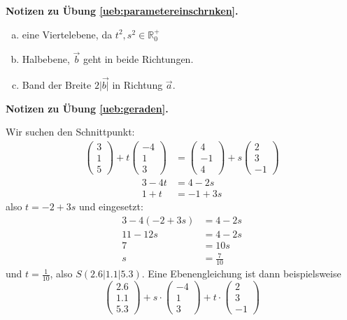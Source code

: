 \documentclass[%
11pt,%
twoside,%
titlepage,%
german,%
headsepline%
]{scrartcl}
\theoremstyle{definition}
\theoremstyle{plain}
\newcommand{\concatueb}[1]{ueb:#1}%
\newcommand{\concatlsg}[1]{lsg:#1}%
\newenvironment{lsg}[1]{%
    \par\noindent\textbf{Notizen zu Übung \ref{\concatueb{#1}}.}%
    \label{\concatlsg{#1}}
}{%
    \par%
}
\begin{document}
\begin{lsg}{parametereinschrnken}
\begin{enumerate}[a)]
    \item eine Viertelebene, da $t^2,s^2\in\mathbb{R}_0^+$
    \item Halbebene, $\vec{b}$ geht in beide Richtungen.
    \item Band der Breite $2|\vec{b|}$ in Richtung $\vec{a}$.
\end{enumerate}
\end{lsg}
\begin{lsg}{geraden}
Wir suchen den Schnittpunkt:
\begin{align*}
    \begin{pmatrix}3\\1\\5\end{pmatrix}+t\begin{pmatrix}-4\\1\\3\end{pmatrix} &= \begin{pmatrix}4\\-1\\4\end{pmatrix}+s\begin{pmatrix}2\\3\\-1\end{pmatrix}
\end{align*}
\begin{align*}
    3-4t &= 4-2s\\
    1+t &= -1+3s
\end{align*}
also $t=-2+3s$ und eingesetzt:
\begin{align*}
    3-4(-2+3s) &= 4-2s\\
    11-12s &= 4-2s\\
    7 &= 10s\\
    s &= \frac{7}{10}
\end{align*}
und $t=\frac{1}{10}$, also $S(2.6|1.1|5.3)$. Eine Ebenengleichung ist dann beispielsweise
$$\begin{pmatrix}
    2.6\\1.1\\5.3
\end{pmatrix}+s\cdot\begin{pmatrix}
    -4\\1\\3
\end{pmatrix}+t\cdot\begin{pmatrix}
    2\\3\\-1
\end{pmatrix}$$
\end{lsg}
\end{document}
